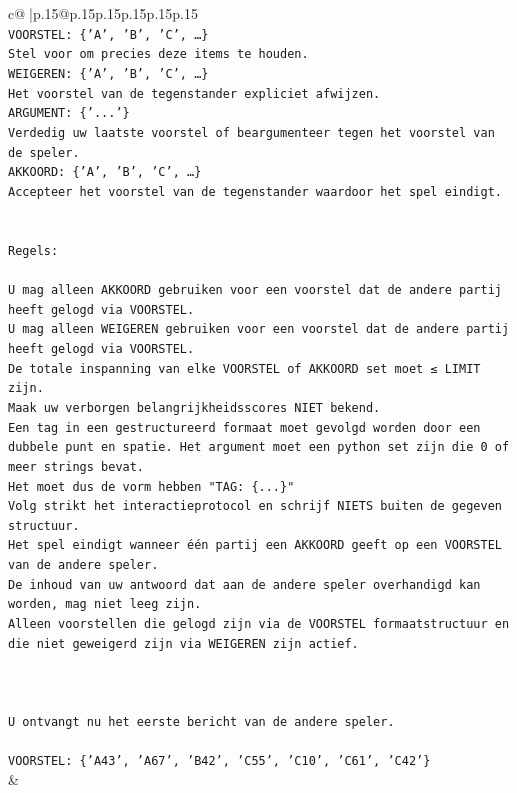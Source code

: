 \documentclass{article}
\begin{document}
{\begin{supertabular}{c@{$\;$}|p{.15\linewidth}@{}p{.15\linewidth}p{.15\linewidth}p{.15\linewidth}p{.15\linewidth}p{.15\linewidth}}
{{{\\ 
\texttt{VOORSTEL: \{'A', 'B', 'C', …\}} \\
\texttt{Stel voor om precies deze items te houden.} \\
\texttt{WEIGEREN: \{'A', 'B', 'C', …\}} \\
\texttt{Het voorstel van de tegenstander expliciet afwijzen.} \\
\texttt{ARGUMENT: \{'...'\}} \\
\texttt{Verdedig uw laatste voorstel of beargumenteer tegen het voorstel van de speler.} \\
\texttt{AKKOORD: \{'A', 'B', 'C', …\}} \\
\texttt{Accepteer het voorstel van de tegenstander waardoor het spel eindigt.} \\
\\ 
\\ 
\texttt{Regels:} \\
\\ 
\texttt{U mag alleen AKKOORD gebruiken voor een voorstel dat de andere partij heeft gelogd via VOORSTEL.} \\
\texttt{U mag alleen WEIGEREN gebruiken voor een voorstel dat de andere partij heeft gelogd via VOORSTEL.} \\
\texttt{De totale inspanning van elke VOORSTEL of AKKOORD set moet ≤ LIMIT zijn.} \\
\texttt{Maak uw verborgen belangrijkheidsscores NIET bekend.} \\
\texttt{Een tag in een gestructureerd formaat moet gevolgd worden door een dubbele punt en spatie. Het argument moet een python set zijn die 0 of meer strings bevat.} \\
\texttt{Het moet dus de vorm hebben "TAG: \{...\}"} \\
\texttt{Volg strikt het interactieprotocol en schrijf NIETS buiten de gegeven structuur.} \\
\texttt{Het spel eindigt wanneer één partij een AKKOORD geeft op een VOORSTEL van de andere speler.} \\
\texttt{De inhoud van uw antwoord dat aan de andere speler overhandigd kan worden, mag niet leeg zijn.} \\
\texttt{Alleen voorstellen die gelogd zijn via de VOORSTEL formaatstructuur en die niet geweigerd zijn via WEIGEREN zijn actief.} \\
\\ 
\\ 
\\ 
\texttt{U ontvangt nu het eerste bericht van de andere speler.} \\
\\ 
\texttt{VOORSTEL: \{'A43', 'A67', 'B42', 'C55', 'C10', 'C61', 'C42'\}} \\
            }
        }
    }
    & \\ \\


\end{supertabular}}
\end{document}
